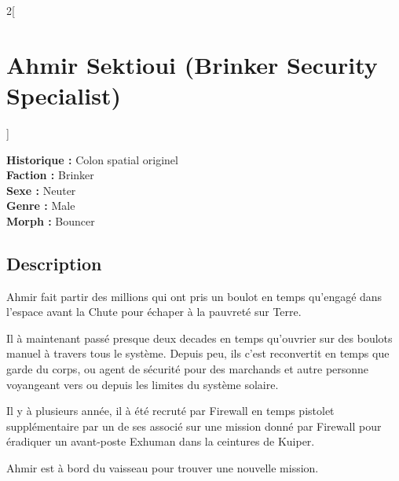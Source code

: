 \documentclass[a4paper,9pt]{article}
\begin{document}
\begin{multicols}{2}[\section*{Ahmir Sektioui (Brinker Security Specialist)}]

   \noindent\textbf{Historique :} Colon spatial originel\\
   \noindent\textbf{Faction :} Brinker\\
   \noindent\textbf{Sexe :} Neuter\\
   \noindent\textbf{Genre :} Male\\
   \noindent\textbf{Morph :} Bouncer\\

   \subsection*{Description}

   Ahmir fait partir des millions qui ont pris un boulot en temps qu'engagé dans
   l'espace avant la Chute pour échaper à la pauvreté sur Terre.

   Il à maintenant passé presque deux decades en temps qu'ouvrier sur des boulots
   manuel à travers tous le système.
   Depuis peu, ils c'est reconvertit en temps que garde du corps, ou agent de
   sécurité pour des marchands et autre personne voyangeant vers ou depuis
   les limites du système solaire.

   Il y à plusieurs année, il à été recruté par Firewall en temps pistolet
   supplémentaire par un de ses associé sur une mission donné par Firewall
   pour éradiquer un avant-poste Exhuman dans la ceintures de Kuiper.

   Ahmir est à bord du vaisseau pour trouver une nouvelle mission.


\end{multicols}
\end{document}
